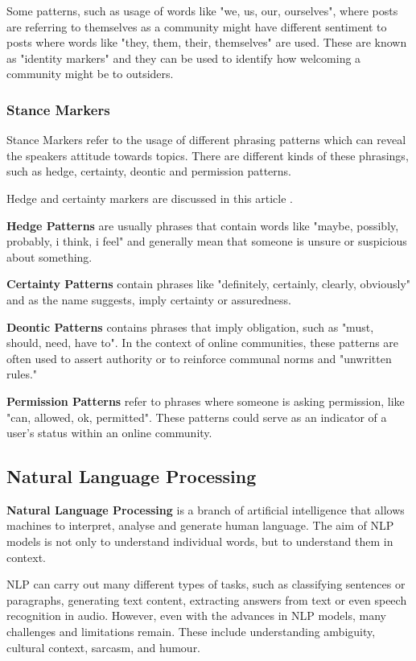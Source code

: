 \documentclass[12pt, a4paper]{article}
\begin{document}
Some patterns, such as usage of words like "we, us, our, ourselves", where posts are referring to themselves as a community might have different sentiment to posts where words like "they, them, their, themselves" are used. These are known as "identity markers" and they can be used to identify how welcoming a community might be to outsiders.

\subsubsection{Stance Markers}
\label{sec:stance_markers}
Stance Markers refer to the usage of different phrasing patterns which can reveal the speakers attitude towards topics. There are different kinds of these phrasings, such as hedge, certainty, deontic and permission patterns.

Hedge and certainty markers are discussed in this article \cite{shen2021stance}.

\textbf{Hedge Patterns} are usually phrases that contain words like "maybe, possibly, probably, i think, i feel" and generally mean that someone is unsure or suspicious about something.

\textbf{Certainty Patterns} contain phrases like "definitely, certainly, clearly, obviously" and as the name suggests, imply certainty or assuredness.

\textbf{Deontic Patterns} contains phrases that imply obligation, such as "must, should, need, have to". In the context of online communities, these patterns are often used to assert authority or to reinforce communal norms and "unwritten rules."

\textbf{Permission Patterns} refer to phrases where someone is asking permission, like "can, allowed, ok, permitted". These patterns could serve as an indicator of a user's status within an online community.

\subsection{Natural Language Processing}
\textbf{Natural Language Processing} is a branch of artificial intelligence that allows machines to interpret, analyse and generate human language. The aim of NLP models is not only to understand individual words, but to understand them in context.

NLP can carry out many different types of tasks, such as classifying sentences or paragraphs, generating text content, extracting answers from text or even speech recognition in audio. However, even with the advances in NLP models, many challenges and limitations remain. These include understanding ambiguity, cultural context, sarcasm, and humour.
\end{document}
